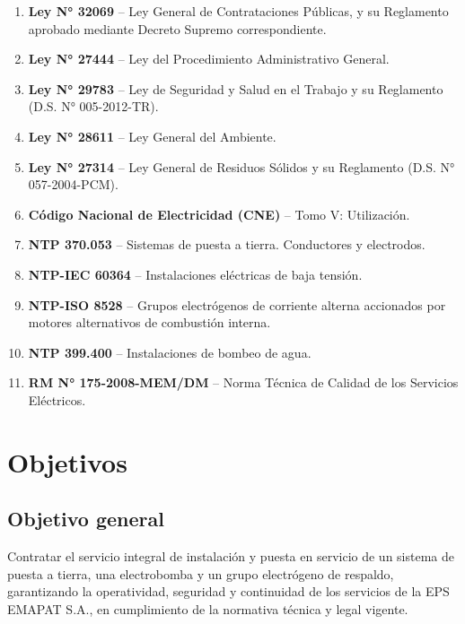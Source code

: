 \documentclass[12pt,a4paper]{article}
\begin{document}
\begin{enumerate}[label=\textbf{\arabic{enumi}.}]
  \item \textbf{Ley N° 32069} -- Ley General de Contrataciones Públicas, y su Reglamento aprobado mediante Decreto Supremo correspondiente.
  \item \textbf{Ley N° 27444} -- Ley del Procedimiento Administrativo General.
  \item \textbf{Ley N° 29783} -- Ley de Seguridad y Salud en el Trabajo y su Reglamento (D.S. N° 005-2012-TR).
  \item \textbf{Ley N° 28611} -- Ley General del Ambiente.
  \item \textbf{Ley N° 27314} -- Ley General de Residuos Sólidos y su Reglamento (D.S. N° 057-2004-PCM).
  \item \textbf{Código Nacional de Electricidad (CNE)} -- Tomo V: Utilización.
  \item \textbf{NTP 370.053} -- Sistemas de puesta a tierra. Conductores y electrodos.
  \item \textbf{NTP-IEC 60364} -- Instalaciones eléctricas de baja tensión.
  \item \textbf{NTP-ISO 8528} -- Grupos electrógenos de corriente alterna accionados por motores alternativos de combustión interna.
  \item \textbf{NTP 399.400} -- Instalaciones de bombeo de agua.
  \item \textbf{RM N° 175-2008-MEM/DM} -- Norma Técnica de Calidad de los Servicios Eléctricos.
\end{enumerate}

\section{Objetivos}

\subsection{Objetivo general}

Contratar el servicio integral de instalación y puesta en servicio de un sistema de puesta a tierra, una electrobomba y un grupo electrógeno de respaldo, garantizando la operatividad, seguridad y continuidad de los servicios de la EPS EMAPAT S.A., en cumplimiento de la normativa técnica y legal vigente.
\end{document}
